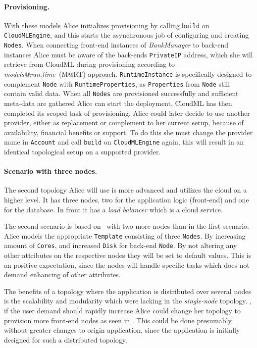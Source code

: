 \paragraph{Provisioning.}

With these models Alice initializes provisioning by calling 
\texttt{build} on \texttt{CloudMLEngine},
and this starts the asynchronous job of configuring and creating \texttt{Nodes}.
When connecting front-end instances of \emph{BankManager} to back-end instances Alice must 
be aware of the back-ends \texttt{PrivateIP} address, which she will retrieve from CloudML
during provisioning according to \emph{models@run.time}~(M@RT) approach.
\texttt{RuntimeInstance} is specifically designed to complement \texttt{Node} with \texttt{RuntimeProperties},
as \texttt{Properties} from \texttt{Node} still contain valid data.
When all \texttt{Nodes} are provisioned successfully and sufficient meta-data are gathered
Alice can start the deployment, CloudML has then completed its scoped task of provisioning.
Alice could later decide to use another provider, either as replacement or complement to her current setup,
because of availability, financial benefits or support.
To do this she must change the provider name in \texttt{Account} and call \texttt{build} on \texttt{CloudMLEngine} again,
this will result in an identical topological setup on a supported provider.

\hr

\paragraph{Scenario with three nodes.}
The second topology Alice will use is more advanced and utilizes the cloud on a higher level.
It has three nodes, two for the application logic (front-end) and one for the database.
In front it has a \emph{load balancer} which is a cloud service.
\hr

The second scenario is based on~ with two more nodes than in the first scenario.
Alice models the appropriate \texttt{Template} consisting
of three \texttt{Nodes}.
By increasing amount of \texttt{Cores}, and increased \texttt{Disk} for back-end \texttt{Node}.
By not altering any other attributes on the respective nodes they will be set to default values.
This is an positive expectation, since the nodes will handle specific tasks which does not 
demand enhancing of other attributes.

The benefits of a topology where the application is distributed over several nodes 
is the scalability and modularity which were lacking in the \emph{single-node} topology.
\eg, if the user demand should rapidly increase Alice could change her topology to
provision more front-end nodes as seen in .
This could be done presumably without greater changes to origin application,
since the application is initially designed for such a distributed topology.


